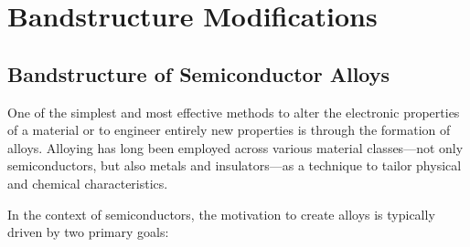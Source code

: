 \chapter{Bandstructure Modifications}

\section{Bandstructure of Semiconductor Alloys}
One of the simplest and most effective methods to alter the electronic properties of a material or to engineer entirely new properties is through the formation of alloys. Alloying has long been employed across various material classes—not only semiconductors, but also metals and insulators—as a technique to tailor physical and chemical characteristics.

In the context of semiconductors, the motivation to create alloys is typically driven by two primary goals:

